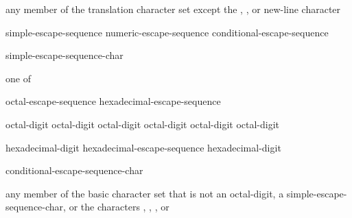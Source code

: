 \begin{bnf}
\br
    \textnormal{any member of the translation character set except the ,}\br
    \bnfindent\textnormal{, or new-line character}
\end{bnf}

\begin{bnf}
\br
    simple-escape-sequence\br
    numeric-escape-sequence\br
    conditional-escape-sequence
\end{bnf}

\begin{bnf}
\br
    \terminal{\textbackslash} simple-escape-sequence-char
\end{bnf}

\begin{bnf}
 \textnormal{one of}\br
\end{bnf}

\begin{bnf}
\br
    octal-escape-sequence\br
    hexadecimal-escape-sequence
\end{bnf}

\begin{bnf}
\br
    \terminal{\textbackslash} octal-digit\br
    \terminal{\textbackslash} octal-digit octal-digit\br
    \terminal{\textbackslash} octal-digit octal-digit octal-digit
\end{bnf}

\begin{bnf}
\br
     hexadecimal-digit\br
    hexadecimal-escape-sequence hexadecimal-digit
\end{bnf}

\begin{bnf}
\br
    \terminal{\textbackslash} conditional-escape-sequence-char
\end{bnf}

\begin{bnf}
\br
    \textnormal{any member of the basic character set that is not an} octal-digit\textnormal{, a} simple-escape-sequence-char\textnormal{, or the characters , , , or }
\end{bnf}

